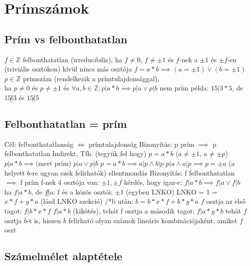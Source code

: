 \documentclass[12pt,a4paper]{article}
\begin{document}
\pagebreak

\section{Prímszámok}

\subsection{Prím vs felbonthatatlan}

\begin{outline}
	\1 $f \in \mathbb{Z}$ felbonthatatlan (irreducibilis), ha $f \ne 0$, $f \ne \pm 1$
	és $f$-nek a $\pm 1$ és $\pm f$-en (triviális osztókon) kívül nincs más osztója
			\2 $f=a*b \implies (a = \pm 1) \lor (b = \pm 1)$
	\1 $p \in \mathbb{Z}$ primszám (rendelkezik a prímtulajdonsággal),\\
	ha $p \ne 0$ és $p \ne \pm 1$ és $\forall a,b \in \mathbb{Z}: p|a*b \implies p|a \lor p|b$
		\2 nem prím példa: $15|3*5$, de $15 \not | 3$ és $15 \not | 5$
\end{outline}

\subsection{Felbonthatatlan = prím}

\begin{outline}
	\1 Cél: felbonthatatlanság $\Leftrightarrow$ prímtulajdonság
	\1 Bizonyítás: p prím $\implies$ p felbonthatatlan
		\2 Indirekt, Tfh. (tegyük fel hogy) $p=a*b$ ($a \ne \pm 1$, $a \ne \pm p$)
		\2 $p|a*b \implies \text{(mert prím) } p|a \lor p|b$
		\2 $p=a*b \implies a|p \wedge b|p$
		\2 $p|a \wedge a|p \implies p=\pm a$ ($a$ helyett $b$-re ugyan ezek felírhatók)
		\2 ellentmondás
	\1 Bizonyítás: f felbonthatatlan $\implies$ f prím
		\2 f-nek 4 osztója van: $\pm 1, \pm f$
		\2 kérdés, hogy igaz-e: $f|a*b \implies f|a \lor f|b$
		\2 ha $f|a*b$, de $f\not | a$:
			\3 f és a közös osztói: $\pm 1$ (egyben LNKO)
			\3 LNKO = 1 = $x*f+y*a$ (lásd LNKO szekció)
			\3 /*b után: $b = b*x*f + b*y*a$
			\3 $f$ osztja az első tagot: $f|b*x*f$
			\3 $f|a*b$ (kikötés), tehát f osztja a második tagot: $f|a*y*b$
			\3 tehát $f$ osztja $b$-t is, hiszen $b$ felírható
			olyan számok lineáris kombinációjaként, amiket $f$ oszt
\end{outline}

\pagebreak

\subsection{Számelmélet alaptétele}
\end{document}
